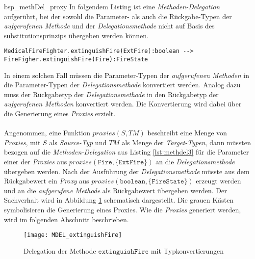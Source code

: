 \begin{example}{bsp_methDel_proxy}
In folgendem Listing ist eine \emph{Methoden-Delegation} aufgerührt, bei der sowohl die Parameter- als auch die Rückgabe-Typen der \emph{aufgerufenen Methode} und der \emph{Delegationsmethode} nicht auf Basis des \Gls{substitutionsprinzip}s übergeben werden können.
\begin{lstlisting}[style = dsl, caption = Methoden-Delegation mit Typkonvertierung, captionpos = b, label = lst:methdel3 ]
	MedicalFireFighter.extinguishFire(ExtFire):boolean --> FireFigher.extinguishFire(Fire):FireState
\end{lstlisting}
\end{example}
In einem solchen Fall müssen die Parameter-Typen der \emph{aufgerufenen Methoden} in die Parameter-Typen der \emph{Delegationsmethode} konvertiert werden. Analog dazu muss der Rückgabetyp der \emph{Delegationsmethode} in den Rückgabetyp der \emph{aufgerufenen Methoden} konvertiert werden. Die Konvertierung wird dabei über die Generierung eines \emph{Proxies} erzielt.
\\\\
Angenommen, eine Funktion $\mathit{proxies(S,TM)}$ beschreibt eine Menge von \emph{Proxies}, mit $S$ als \emph{Source-Typ} und $\mathit{TM}$ als Menge der \emph{Target-Typen}, dann müssten bezogen auf die \emph{Methoden-Delegation} aus Listing \ref{lst:methdel3} für die Parameter einer der \emph{Proxies} aus $\mathit{proxies(\texttt{Fire}, \{\texttt{ExtFire}\})}$ an die \emph{Delegationsmethode} übergeben werden. Nach der Ausführung der \emph{Delegationsmethode} müsste aus dem Rückgabewert ein \emph{Proxy} aus $\mathit{proxies(\texttt{boolean},\{\texttt{FireState}\})}$ erzeugt werden und an die \emph{aufgerufene Methode} als Rückgabewert übergeben werden. Der Sachverhalt wird in Abbildung \ref{fig:DEL_extinguishFire} schematisch dargestellt. Die grauen Kästen symbolisieren die Generierung eines Proxies. Wie die \emph{Proxies} generiert werden, wird im folgenden Abschnitt beschrieben.
\newpage
\begin{figure}[H]
\centering
\texttt{[image: MDEL\_extinguishFire]}
\caption{Delegation der Methode $\texttt{extinguishFire}$ mit Typkonvertierungen}
\label{fig:DEL_extinguishFire}
\end{figure}
\noindent


